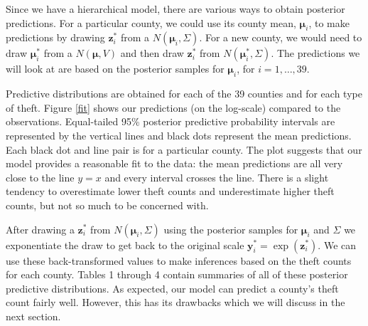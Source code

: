 \documentclass{asaproc}
\newcommand{\m}[1]{\mathbf{\bm{#1}}}
\begin{document}
Since we have a hierarchical model, there are various ways to obtain posterior predictions. For a particular county, we could use its county mean, $\m{\mu}_i$, to make predictions by drawing $\m{z}_i^*$ from a $N(\m{\mu}_i,\Sigma)$. For a new county, we would need to draw $\m{\mu}_i^*$ from a $N(\m{\mu}, V)$ and then draw $\m{z}_i^*$ from $N(\m{\mu}_i^*,\Sigma)$. The predictions we will look at are based on the posterior samples for $\m{\mu}_i$, for $i=1,\ldots,39$.

Predictive distributions are obtained for each of the 39 counties and for each type of theft. Figure \ref{fit} shows our predictions (on the log-scale) compared to the observations. Equal-tailed 95\% posterior predictive probability intervals are represented by the vertical lines and black dots represent the mean predictions. Each black dot and line pair is for a particular county. The plot suggests that our model provides a reasonable fit to the data: the mean predictions are all very close to the line $y=x$ and every interval crosses the line. There is a slight tendency to overestimate lower theft counts and underestimate higher theft counts, but not so much to be concerned with.

After drawing a $\m{z}_i^*$ from $N(\m{\mu}_i, \Sigma)$ using the posterior samples for $\m{\mu}_i$ and $\Sigma$ we exponentiate the draw to get back to the original scale $\m{y}_i^*=\exp(\m{z}_i^*)$. We can use these back-transformed values to make inferences based on the theft counts for each county. Tables 1 through 4 contain summaries of all of these posterior predictive distributions. As expected, our model can predict a county's theft count fairly well. However, this has its drawbacks which we will discuss in the next section.
\end{document}
